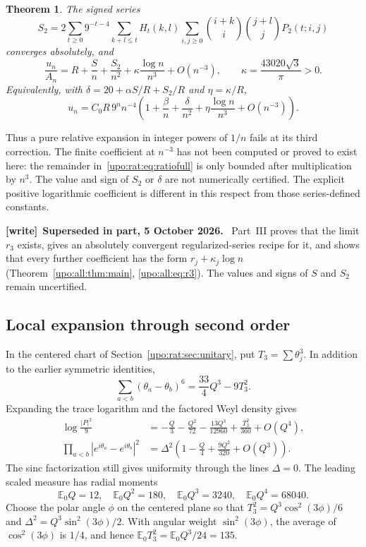 \documentclass[11pt,letterpaper]{article}
\newtheorem{theorem}{Theorem}[section]
\theoremstyle{remark}\newtheorem{remark}[theorem]{Remark}
\numberwithin{equation}{section}
\newcommand{\E}{\mathbb E}
\newenvironment{writenote}[1][]{\par\smallskip\begingroup\small
 \noindent\textbf{[write]}\if\relax\detokenize{#1}\relax\else~\textbf{#1.}\fi\ }%
 {\par\endgroup\smallskip}
\begin{document}
\begin{theorem}\label{upo:rat:thm:secondlog}
The signed series
\begin{equation}\label{upo:rat:eq:S2raw}
S_2=2\sum_{t\ge0}9^{-t-4}\sum_{k+l\le t}H_t(k,l)
\sum_{i,j\ge0}\binom{i+k}{i}\binom{j+l}{j}P_2(t;i,j)
\end{equation}
converges absolutely, and
\begin{equation}\label{upo:rat:eq:ratiofull}
\frac{u_n}{A_n}=R+\frac Sn+\frac{S_2}{n^2}
+\kappa\frac{\log n}{n^3}+O(n^{-3}),
\qquad \kappa=\frac{43020\sqrt3}{\pi}>0.
\end{equation}
Equivalently, with $\delta=20+\alpha S/R+S_2/R$ and $\eta=\kappa/R$,
\begin{equation}\label{upo:rat:eq:ufull}
u_n=C_0R\,9^n n^{-4}
\left(1+\frac\beta n+\frac\delta{n^2}
+\eta\frac{\log n}{n^3}+O(n^{-3})\right).
\end{equation}
\end{theorem}
Thus a pure relative expansion in integer powers of $1/n$ fails at its
third correction. The finite coefficient at $n^{-3}$ has not been
computed or proved to exist here: the remainder in~\eqref{upo:rat:eq:ratiofull}
is only bounded after multiplication by $n^3$.
The value and sign of $S_2$ or $\delta$ are not numerically certified.
The explicit positive logarithmic coefficient is different in this
respect from those series-defined constants.
\begin{writenote}[Superseded in part, 5 October 2026]
Part~III proves that the limit $r_3$ exists, gives an absolutely convergent regularized-series recipe for it, and shows that every further coefficient has the form $r_j+\kappa_j\log n$ (Theorem~\ref{upo:all:thm:main}, \eqref{upo:all:eq:r3}). The values and signs of $S$ and $S_2$ remain uncertified.
\end{writenote}

\subsection{Local expansion through second order}
In the centered chart of Section~\ref{upo:rat:sec:unitary}, put
$T_3=\sum\theta_j^3$. In addition to the earlier symmetric identities,
\[
\sum_{a<b}(\theta_a-\theta_b)^6=\frac{33}{4}Q^3-9T_3^2.
\]
Expanding the trace logarithm and the factored Weyl density gives
\begin{align}
\log\frac{|P|^2}{9}
&=-\frac Q3-\frac{Q^2}{72}-\frac{13Q^3}{12960}
+\frac{T_3^2}{360}+O(Q^4),\label{upo:rat:eq:tracehigher}\\
\prod_{a<b}|e^{i\theta_a}-e^{i\theta_b}|^2
&=\Delta^2\left(1-\frac Q4+\frac{9Q^2}{320}+O(Q^3)\right).
\label{upo:rat:eq:Weylhigher}
\end{align}
The sinc factorization still gives uniformity through the lines
$\Delta=0$. The leading scaled measure has radial moments
\[
\E_0Q=12,\quad \E_0Q^2=180,\quad \E_0Q^3=3240,\quad \E_0Q^4=68040.
\]
Choose the polar angle $\phi$ on the centered plane so that
$T_3^2=Q^3\cos^2(3\phi)/6$ and
$\Delta^2=Q^3\sin^2(3\phi)/2$. With angular weight $\sin^2(3\phi)$,
the average of $\cos^2(3\phi)$ is $1/4$, and hence
$\E_0T_3^2=\E_0Q^3/24=135$.
\end{document}
